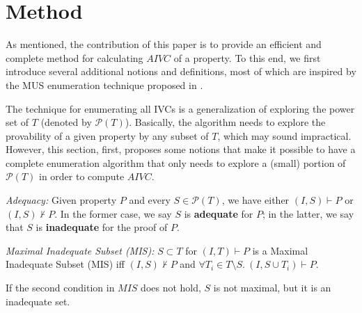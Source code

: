\section{Method}
\label{sec:allivcs}

\newcommand{\getivc}{\textsc{GetIVC}}
\newcommand{\getmodel}{\textsc{GetLiteralsFromMaxModel}}
\newcommand{\aivcalg}{AIVC\xspace}
\newcommand{\blockup}{\textsc{BlockUp}}
\newcommand{\blockdown}{\textsc{BlockDown}}
\newcommand{\mis}{\textsc{MIS}}
\newcommand{\mcs}{\textsc{MCS}}

\newcommand{\checksat}{\textsc{CheckSat}}
\newcommand{\isadeq}{\textsc{CheckAdq}}
\newcommand{\actlit}{\textsc{ActLit}}
\newcommand{\unsatcore}{\textsc{UnsatCore}\xspace}
\newcommand{\unsat}{\texttt{UNSAT}\xspace}
\newcommand{\sat}{\texttt{SAT}\xspace}

As mentioned, the contribution of this paper is to provide an efficient and complete method for calculating $AIVC$ of a property. To this end, we first introduce several additional notions and definitions, most of which are inspired by the MUS enumeration technique proposed in \cite{marco2016fast}.

The technique for enumerating all IVCs is a generalization of exploring the power set of $T$ (denoted by $ \mathcal{P}(T) $).
Basically, the algorithm needs to explore the provability of a
given property by any subset of $T$, which may sound impractical.
However, this section, first, proposes some notions that make it possible to have a complete
enumeration algorithm that only needs to explore a (small) portion of $\mathcal{P}(T)$
in order to compute $AIVC$.

\begin{definition} {\emph{Adequacy:}}
\label{def:adeq}
Given property $P$ and every $S \in \mathcal{P}(T)$, we have either $(I, S) \vdash P$ or $(I, S) \nvdash P$. In the former case, we say $S$ is \textbf{adequate} for $P$; in the latter, we say that $S$ is \textbf{inadequate} for the proof of $P$.
\end{definition}

\begin{definition}{\emph{Maximal Inadequate Subset (MIS):}}
  \label{def:mis}
  $S \subset T$ for $(I, T) \vdash P$ is a Maximal Inadequate Subset (MIS) iff
  $(I, S) \nvdash P$ and $\forall T_i \in T\setminus S.~ (I, S\cup{T_i}) \vdash P$.
\end{definition}
\begin{note}
If the second condition in $MIS$ does not hold, $S$ is not maximal, but it is an inadequate set.
\end{note}

